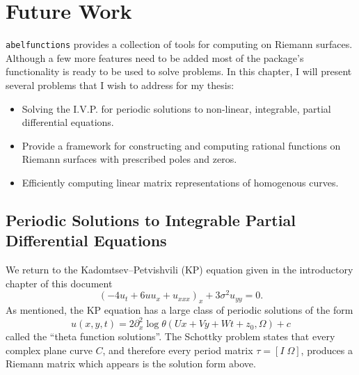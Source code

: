 \section{Future Work}

{\tt abelfunctions} provides a collection of tools for computing on
Riemann surfaces. Although a few more features need to be added most of
the package's functionality is ready to be used to solve problems. In
this chapter, I will present several problems that I wish to address for
my thesis:
\begin{itemize}
  \item Solving the I.V.P. for periodic solutions to non-linear,
    integrable, partial differential equations.
  \item Provide a framework for constructing and computing rational
    functions on Riemann surfaces with prescribed poles and zeros.
  \item Efficiently computing linear matrix representations of
    homogenous curves.
\end{itemize}



\subsection{Periodic Solutions to Integrable Partial Differential Equations}



We return to the Kadomtsev--Petvishvili (KP) equation given in the
introductory chapter of this document
\begin{equation*}
    \left(-4u_t + 6uu_x + u_{xxx}\right)_x + 3\sigma^2 u_{yy} = 0.
\end{equation*}
As mentioned, the KP equation has a large class of periodic solutions of
the form
\begin{equation}\label{eqn: solnformula}
    u(x,y,t) = 2 \partial_x^2 \log \theta(Ux + Vy + Wt + z_0, \Omega) + c
\end{equation}
called the ``theta function solutions''. The Schottky problem states
that every complex plane curve $C$, and therefore every period matrix
$\tau = [I \; \Omega]$, produces a Riemann matrix which appears is the
solution form above.

